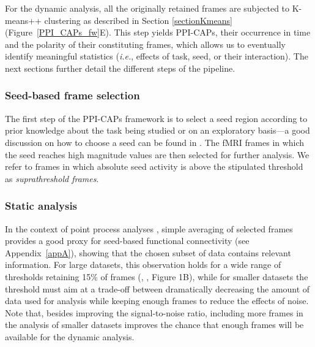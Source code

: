 For the dynamic analysis, all the originally retained frames are subjected to K-means++ clustering  \citep{Arthur2007} as described in Section \ref{sectionKmeans} (Figure~\ref{PPI_CAPs_fw}E). This step yields PPI-CAPs, their occurrence in time and the polarity of their constituting frames, which allows us to eventually identify meaningful statistics (\textit{i.e.}, effects of task, seed, or their interaction). The next sections further detail the different steps of the pipeline.

\subsubsection{Seed-based frame selection}

The first step of the PPI-CAPs framework is to select a seed region according to prior knowledge about the task being studied or on an exploratory basis---a good discussion on how to choose a seed can be found in \citet{OReilly2012a}. The fMRI frames in which the seed reaches high magnitude values are then selected for further analysis. We refer to frames in which absolute seed activity is above the stipulated threshold as \textit{suprathreshold frames}.

\subsubsection{Static analysis} \label{met:static_analysis}
In the context of point process analyses \citep{Tagliazucchi2012,Liu2013}, simple averaging of selected frames provides a good proxy for seed-based functional connectivity (see Appendix~\ref{appA}), showing that the chosen subset of data contains relevant information. For large datasets, this observation holds for a wide range of thresholds retaining 15\% of frames (\citeauthor{Liu2013}, \citeyear{Liu2013}, Figure 1B), while for smaller datasets the threshold must aim at a trade-off between dramatically decreasing the amount of data used for analysis while keeping enough frames to reduce the effects of noise. Note that, besides improving the signal-to-noise ratio, including more frames in the analysis of smaller datasets improves the chance that enough frames will be available for the dynamic analysis.

